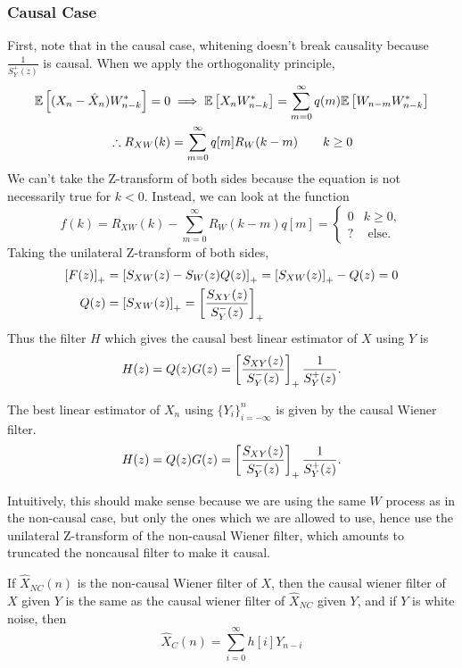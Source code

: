 \subsubsection{Causal Case}
First, note that in the causal case, whitening doesn't break causality because $\frac{1}{S_Y^+(z)}$ is causal.
When we apply the orthogonality principle,
\begin{align*}
	\mathbb{E}\left[(X_n-\hat{X}_n)W_{n-k}^*\right] = 0 &\implies \mathbb{E}\left[X_nW^*_{n-k}\right] = \sum_{m=0}^\infty q(m)\mathbb{E}\left[W_{n-m}W^*_{n-k}\right]\\
	\therefore R_{XW}(k) &= \sum_{m = 0}^\infty q[m]R_W(k-m) \qquad k \geq 0
\end{align*}
We can't take the Z-transform of both sides because the equation is not necessarily true for $k < 0$.
Instead, we can look at the function \[
	f(k) = R_{XW}(k) - \sum_{m=0}^\infty R_W(k-m)q[m] = \begin{cases} 0 & k\geq 0,\\ ? & \text{ else.}\end{cases}
\]
Taking the unilateral Z-transform of both sides,
\begin{align*}
	\left[F(z)\right]_+ &= \left[S_{XW}(z) - S_W(z)Q(z)\right]_+ = \left[S_{XW}(z)\right]_+ - Q(z) = 0\\
	Q(z) &= \left[S_{XW}(z)\right]_+ = \left[\frac{S_{XY}(z)}{S_Y^-(z)}\right]_+
\end{align*}
Thus the filter $H$ which gives the causal best linear estimator of $X$ using $Y$ is \[
	H(z) = Q(z) G(z)= \left[\frac{S_{XY}(z)}{S_Y^-(z)}\right]_+\frac{1}{S_Y^+(z)}.
\]
\begin{definition}
	The best linear estimator of $X_n$ using $\{Y_i\}_{i=-\infty}^{n}$ is given by the causal Wiener filter. \[
		H(z) = Q(z)G(z) = \left[\frac{S_{XY}(z)}{S_Y^-(z)}\right]_+\frac{1}{S_Y^+(z)}.
	\]
	\label{defn:causal-wiener}
\end{definition}
Intuitively, this should make sense because we are using the same $W$ process as in the non-causal case, but only the ones which we are allowed to use, hence use the unilateral Z-transform of the non-causal Wiener filter, which amounts to truncated the noncausal filter to make it causal.
\begin{theorem}
	If $\hat{X}_{NC}(n)$ is the non-causal Wiener filter of $X$, then the causal wiener filter of $X$ given $Y$ is the same as the causal wiener filter of $\hat{X}_{NC}$ given $Y$, and if $Y$ is white noise, then \[
		\hat{X}_C(n) = \sum_{i=0}^{\infty}h[i]Y_{n-i}
	\]
	\label{thm:causal-wiener}
\end{theorem}
